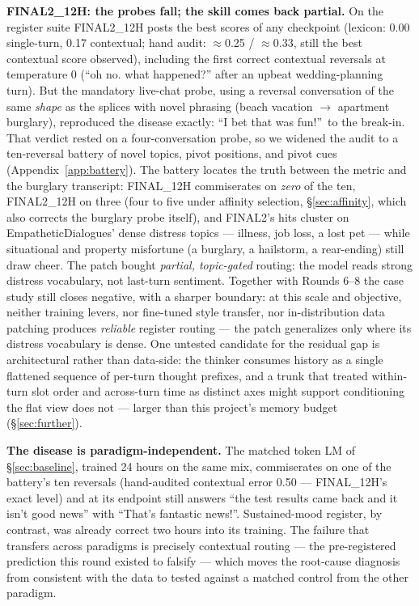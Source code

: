 \documentclass[11pt]{article}
\begin{document}
\textbf{FINAL2\_12H: the probes fall; the skill comes back partial.} On the
register suite FINAL2\_12H posts the best scores of any checkpoint (lexicon:
0.00 single-turn, 0.17 contextual; hand audit: $\approx$0.25 / $\approx$0.33,
still the best contextual score observed), including the first correct
contextual reversals at temperature 0 (``oh no. what happened?'' after an
upbeat wedding-planning turn). But the mandatory live-chat probe, using a
reversal conversation of the same \emph{shape} as the splices with novel
phrasing (beach vacation $\to$ apartment burglary), reproduced the disease
exactly: ``I bet that was fun!''\ to the break-in. That verdict rested on a
four-conversation probe, so we widened the audit to a ten-reversal battery
of novel topics, pivot positions, and pivot cues
(Appendix~\ref{app:battery}). The battery locates the truth between the
metric and the burglary transcript: FINAL\_12H commiserates on \emph{zero}
of the ten, FINAL2\_12H on three (four to five under affinity selection,
\S\ref{sec:affinity}, which also corrects the burglary probe itself), and
FINAL2's hits cluster on EmpatheticDialogues' dense distress topics ---
illness, job loss, a lost pet --- while situational and property misfortune
(a burglary, a hailstorm, a rear-ending) still draw cheer. The patch bought
\emph{partial, topic-gated} routing: the model reads strong distress
vocabulary, not last-turn sentiment. Together with Rounds 6--8 the case
study still closes negative, with a sharper boundary: at this scale and
objective, neither training levers, nor fine-tuned style transfer, nor
in-distribution data patching produces \emph{reliable} register routing ---
the patch generalizes only where its distress vocabulary is dense. One
untested candidate for the residual gap is architectural rather than
data-side: the thinker consumes history as a single flattened sequence of
per-turn thought prefixes, and a trunk that treated within-turn slot order
and across-turn time as distinct axes might support conditioning the flat
view does not --- larger than this project's memory budget
(\S\ref{sec:further}).

\textbf{The disease is paradigm-independent.} The matched token LM of
\S\ref{sec:baseline}, trained 24 hours on the same mix, commiserates on
one of the battery's ten reversals (hand-audited contextual error 0.50 ---
FINAL\_12H's exact level) and at its endpoint still answers ``the test
results came back and it isn't good news'' with ``That's fantastic news!''.
Sustained-mood register, by contrast, was already correct two hours into
its training. The failure that transfers across paradigms is precisely
contextual routing --- the pre-registered prediction this round existed to
falsify --- which moves the root-cause diagnosis from consistent with the
data to tested against a matched control from the other paradigm.
\end{document}
